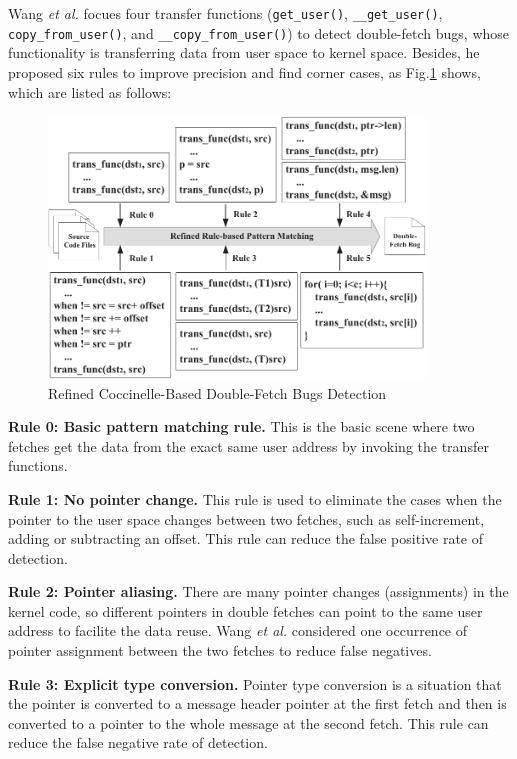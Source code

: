\documentclass[10pt]{llncs}
\begin{document}
Wang \textit{et al.} focues four transfer functions (\verb:get_user():, \verb:__get_user():, \verb:copy_from_user():, and \verb:__copy_from_user():) to detect double-fetch bugs, whose functionality is transferring data from user space to kernel space. Besides, he proposed six rules to improve precision and find corner cases, as Fig.\ref{Cocci} shows, which are listed as follows:

\begin{figure}
  \centering
  \includegraphics[width=10cm]{refined}
  \caption{Refined Coccinelle-Based Double-Fetch Bugs Detection~\cite{wang}}
  \label{Cocci}
\end{figure}


\textbf{Rule 0: Basic pattern matching rule.}
This is the basic scene where two fetches get the data from the exact same user address by invoking the transfer functions. %

\textbf{Rule 1: No pointer change.}
This rule is used to eliminate the cases when the pointer to the user space changes between two fetches, such as self-increment, adding or subtracting an offset. This rule can reduce the false positive rate of detection.

\textbf{Rule 2: Pointer aliasing.}
There are many pointer changes (assignments) in the kernel code, so different pointers in double fetches can point to the same user address to facilite the data reuse. Wang \textit{et al.} considered one occurrence of pointer assignment between the two fetches to reduce false negatives.

\textbf{Rule 3: Explicit type conversion.}
Pointer type conversion is a situation that the pointer is converted to a message header pointer at the first fetch and then is converted to a pointer to the whole message at the second fetch. This rule can reduce the false negative rate of detection.
\end{document}
